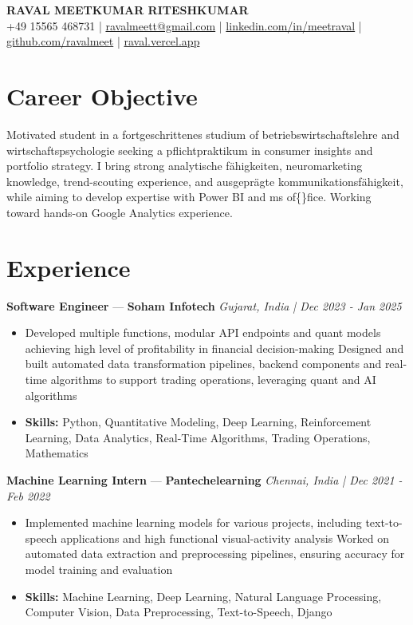 \documentclass[a4paper,10pt]{article}
\begin{document}
\begin{center}
  {\Large\bfseries RAVAL MEETKUMAR RITESHKUMAR}\\[2pt]
  {\small +49 15565 468731 \;|\; \href{mailto:ravalmeett@gmail.com}{ravalmeett@gmail.com} \;|\; \href{https://www.linkedin.com/in/meetraval/}{linkedin.com/in/meetraval} \;|\; \href{https://github.com/ravalmeet}{github.com/ravalmeet} \;|\; \href{https://raval.vercel.app/}{raval.vercel.app}}
\end{center}
\vspace{-3pt}

\section*{Career Objective}
Motivated student in a fortgeschrittenes studium of betriebswirtschaftslehre and wirtschaftspsychologie seeking a pflichtpraktikum in consumer insights and portfolio strategy. I bring strong analytische fähigkeiten, neuromarketing knowledge, trend-scouting experience, and ausgeprägte kommunikationsfähigkeit, while aiming to develop expertise with Power BI and ms of\{\}fice. Working toward hands-on Google Analytics experience.\par

\section*{Experience}
\textbf{Software Engineer} — \textbf{Soham Infotech} \hfill \textit{Gujarat, India \;|\; Dec 2023 - Jan 2025}\par
\vspace{1pt}
\begin{itemize}
  \item Developed multiple functions, modular API endpoints and quant models achieving high level of profitability in financial decision-making Designed and built automated data transformation pipelines, backend components and real-time algorithms to support trading operations, leveraging quant and AI algorithms
  \item \textbf{Skills:} Python, Quantitative Modeling, Deep Learning, Reinforcement Learning, Data Analytics, Real-Time Algorithms, Trading Operations, Mathematics
\end{itemize}
\vspace{3pt}
\textbf{Machine Learning Intern} — \textbf{Pantechelearning} \hfill \textit{Chennai, India \;|\; Dec 2021 - Feb 2022}\par
\vspace{1pt}
\begin{itemize}
  \item Implemented machine learning models for various projects, including text-to-speech applications and high functional visual-activity analysis Worked on automated data extraction and preprocessing pipelines, ensuring accuracy for model training and evaluation
  \item \textbf{Skills:} Machine Learning, Deep Learning, Natural Language Processing, Computer Vision, Data Preprocessing, Text-to-Speech, Django
\end{itemize}
\end{document}
